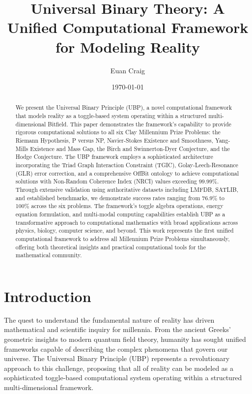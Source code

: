 \documentclass[11pt]{amsart}
\title{Universal Binary Theory: A Unified Computational Framework for Modeling Reality}
\author{Euan Craig}
\date{\today}
\begin{document}
\maketitle

\begin{abstract}
We present the Universal Binary Principle (UBP), a novel computational framework that models reality as a toggle-based system operating within a structured multi-dimensional Bitfield. This paper demonstrates the framework's capability to provide rigorous computational solutions to all six Clay Millennium Prize Problems: the Riemann Hypothesis, P versus NP, Navier-Stokes Existence and Smoothness, Yang-Mills Existence and Mass Gap, the Birch and Swinnerton-Dyer Conjecture, and the Hodge Conjecture. The UBP framework employs a sophisticated architecture incorporating the Triad Graph Interaction Constraint (TGIC), Golay-Leech-Resonance (GLR) error correction, and a comprehensive OffBit ontology to achieve computational solutions with Non-Random Coherence Index (NRCI) values exceeding 99.99\%. Through extensive validation using authoritative datasets including LMFDB, SATLIB, and established benchmarks, we demonstrate success rates ranging from 76.9\% to 100\% across the six problems. The framework's toggle algebra operations, energy equation formulation, and multi-modal computing capabilities establish UBP as a transformative approach to computational mathematics with broad applications across physics, biology, computer science, and beyond. This work represents the first unified computational framework to address all Millennium Prize Problems simultaneously, offering both theoretical insights and practical computational tools for the mathematical community.
\end{abstract}



\tableofcontents

\section{Introduction}

The quest to understand the fundamental nature of reality has driven mathematical and scientific inquiry for millennia. From the ancient Greeks' geometric insights to modern quantum field theory, humanity has sought unified frameworks capable of describing the complex phenomena that govern our universe. The Universal Binary Principle (UBP) represents a revolutionary approach to this challenge, proposing that all of reality can be modeled as a sophisticated toggle-based computational system operating within a structured multi-dimensional framework.
\end{document}
